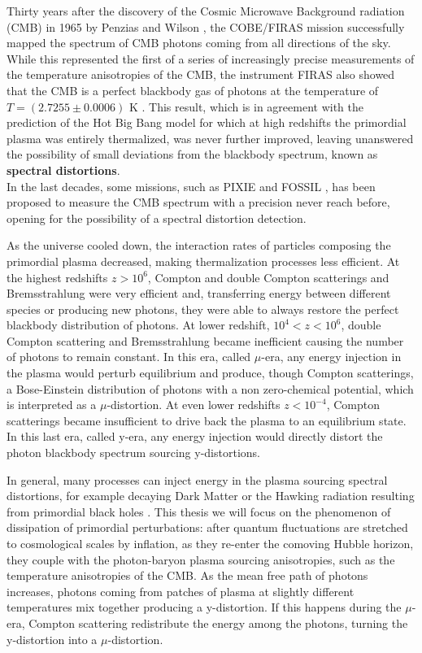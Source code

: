 Thirty years after the discovery of the Cosmic Microwave Background radiation (CMB) in 1965 by Penzias and Wilson \cite{1965ApJ...142..419P}, the COBE/FIRAS mission \cite{COBE1996} successfully mapped the spectrum of CMB photons coming from all directions of the sky. While this represented the first of a series of increasingly precise measurements of the temperature anisotropies of the CMB, the instrument FIRAS also showed that the CMB is a perfect blackbody gas of photons at the temperature of $T=(2.7255\pm0.0006)$ K \cite{COBE1996}. This result, which is in agreement with the prediction of the Hot Big Bang model for which at high redshifts the primordial plasma was entirely thermalized, was never further improved, leaving unanswered the possibility of small deviations from the blackbody spectrum, known as \textbf{spectral distortions}.\\ In the last decades, some missions, such as PIXIE \cite{pixie} and FOSSIL \cite{IAS_Fossil}, has been proposed to measure the CMB spectrum with a precision never reach before, opening for the possibility of a spectral distortion detection.

As the universe cooled down, the interaction rates of particles composing the primordial plasma decreased, making thermalization processes less efficient. At the highest redshifts $z>10^{6}$, Compton and double Compton scatterings and Bremsstrahlung were very efficient and, transferring energy between different species or producing new photons, they were able to always restore the perfect blackbody distribution of photons. At lower redshift, $10^{4}<z<10^{6}$, double Compton scattering and Bremsstrahlung became inefficient causing the number of photons to remain constant. In this era, called $\mu$-era, any energy injection in the plasma would perturb equilibrium and produce, though Compton scatterings, a Bose-Einstein distribution of photons with a non zero-chemical potential, which is interpreted as a $\mu$-distortion. At even lower redshifts $z<10^{-4}$, Compton scatterings became insufficient to drive back the plasma to an equilibrium state. In this last era, called y-era, any energy injection would directly distort the photon blackbody spectrum sourcing y-distortions.

In general, many processes can inject energy in the plasma sourcing spectral distortions, for example decaying Dark Matter or the Hawking radiation resulting from primordial black holes \cite{Lucca_2020}. This thesis we will focus on the phenomenon of dissipation of primordial perturbations: after quantum fluctuations are stretched to cosmological scales by inflation, as they re-enter the comoving Hubble horizon, they couple with the photon-baryon plasma sourcing anisotropies, such as the temperature anisotropies of the CMB. As the mean free path of photons increases, photons coming from patches of plasma at slightly different temperatures mix together producing a y-distortion. If this happens during the $\mu$-era, Compton scattering redistribute the energy among the photons, turning the y-distortion into a $\mu$-distortion.\\

